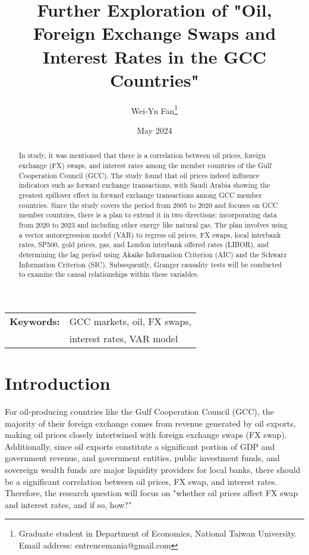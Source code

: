 \documentclass[12pt]{article}
\title{Further Exploration of "Oil, Foreign Exchange Swaps and Interest Rates in the GCC Countries"}
\author{Wei-Yu Fan\thanks{
Graduate student in Department of Economics, National Taiwan University.\\ 
Email address: entrencemania@gmail.com
}
}
\date{May 2024}
\begin{document}
\maketitle
\begin{sloppypar}
\begin{spacing}{0}
\begin{abstract}
\noindent 
In \textcite{almaskati2022oil} study, it was mentioned that there is a correlation between oil prices, foreign exchange (FX) swaps, and interest rates among the member countries of the Gulf Cooperation Council (GCC). The study found that oil prices indeed influence indicators such as forward exchange transactions, with Saudi Arabia showing the greatest spillover effect in forward exchange transactions among GCC member countries. Since the study covers the period from 2005 to 2020 and focuses on GCC member countries, there is a plan to extend it in two directions: incorporating data from 2020 to 2023 and including other energy like natural gas. The plan involves using a vector autoregression model (VAR) to regress oil prices, FX swaps, local interbank rates, SP500, gold prices, gas, and London interbank offered rates (LIBOR), and determining the lag period using Akaike Information Criterion (AIC) and the Schwarz Information Criterion (SIC). Subsequently, Granger causality tests will be conducted to examine the causal relationships within these variables.
\end{abstract}
\end{spacing}

\begin{tabular}{rl}
    \\
    \textbf{Keywords:} &GCC markets, oil, FX swaps, \\
    &interest rates, VAR model\\
\end{tabular}


\section{Introduction}
For oil-producing countries like the Gulf Cooperation Council (GCC), the majority of their foreign exchange comes from revenue generated by oil exports, making oil prices closely intertwined with foreign exchange swaps (FX swap). Additionally, since oil exports constitute a significant portion of GDP and government revenue, and government entities, public investment funds, and sovereign wealth funds are major liquidity providers for local banks, there should be a significant correlation between oil prices, FX swap, and interest rates. Therefore, the research question will focus on "whether oil prices affect FX swap and interest rates, and if so, how?"


\end{sloppypar}
\end{document}
